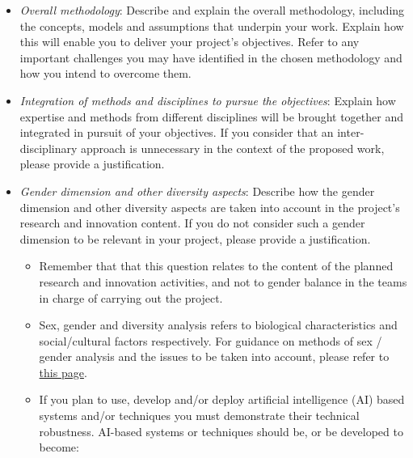 \documentclass[11pt,draftproposal]{msca-pf}
\begin{document}
\begin{itemize}
    \item \emph{Overall methodology}: Describe and explain the overall methodology,
    including the concepts, models and assumptions that underpin your work.
    Explain how this will enable you to deliver your project’s objectives. Refer
    to any important challenges you may have identified in the chosen methodology
    and how you intend to overcome them.

    \item \emph{Integration of methods and disciplines to pursue the objectives}:
    Explain how expertise and methods from different disciplines will be brought
    together and integrated in pursuit of your objectives. If you consider that
    an inter-disciplinary\footnotemark{} approach is unnecessary in the
    context of the proposed work, please provide a justification.


    \item \emph{Gender dimension and other diversity aspects}: Describe how the
    gender dimension and other diversity aspects are taken into account in the
    project's research and innovation content. If you do not consider such a
    gender dimension to be relevant in your project, please provide a
    justification.
    \begin{itemize}
        \item Remember that that this question relates to the content of the
        planned research and innovation activities, and not to gender balance
        in the teams in charge of carrying out the project.

        \item  Sex, gender and diversity analysis refers to biological
        characteristics and social/cultural factors respectively. For guidance on
        methods of sex / gender analysis and the issues to be taken into account,
        please refer to
        \href{https://ec.europa.eu/info/news/gendered-innovations-2-2020-nov-24_en}{this page}.

        \item If you plan to use, develop and/or deploy artificial intelligence
        (AI) based systems and/or techniques you must demonstrate their technical
        robustness. AI-based systems or techniques should be, or be developed to
        become:


\end{itemize}
\end{itemize}
\end{document}
